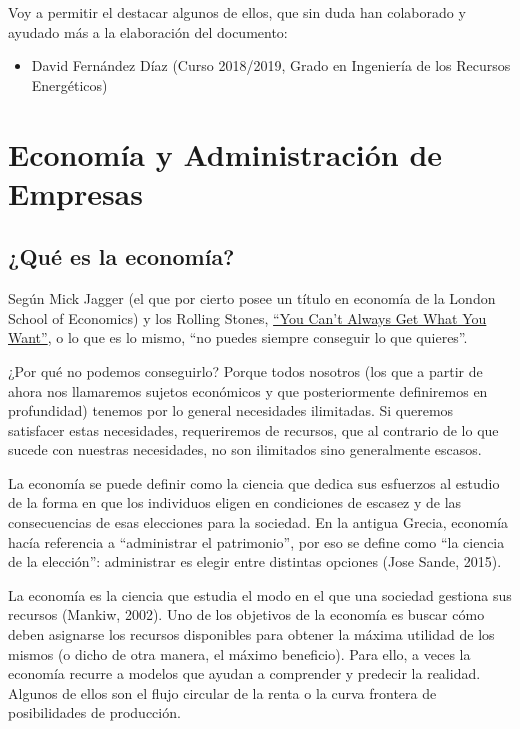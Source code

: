 \documentclass[
]{krantz}
\providecommand{\tightlist}{%
  \setlength{\itemsep}{0pt}\setlength{\parskip}{0pt}}
\begin{document}
Voy a permitir el destacar algunos de ellos, que sin duda han colaborado y ayudado más a la elaboración del documento:

\begin{itemize}
\tightlist
\item
  David Fernández Díaz (Curso 2018/2019, Grado en Ingeniería de los Recursos Energéticos)
\end{itemize}

\mainmatter

\hypertarget{part-economuxeda-y-administraciuxf3n-de-empresas}{%
\part{Economía y Administración de Empresas}\label{part-economuxeda-y-administraciuxf3n-de-empresas}}

\hypertarget{quuxe9-es-la-economuxeda}{%
\chapter{¿Qué es la economía?}\label{quuxe9-es-la-economuxeda}}

Según Mick Jagger (el que por cierto posee un título en economía de la London School of Economics) y los Rolling Stones, \href{https://www.youtube.com/watch?v=oqMl5CRoFdk}{``You Can't Always Get What You Want''}, o lo que es lo mismo, ``no puedes siempre conseguir lo que quieres''.

¿Por qué no podemos conseguirlo? Porque todos nosotros (los que a partir de ahora nos llamaremos sujetos económicos y que posteriormente definiremos en profundidad) tenemos por lo general necesidades ilimitadas. Si queremos satisfacer estas necesidades, requeriremos de recursos, que al contrario de lo que sucede con nuestras necesidades, no son ilimitados sino generalmente escasos.

La economía se puede definir como la ciencia que dedica sus esfuerzos al estudio de la forma en que los individuos eligen en condiciones de escasez y de las consecuencias de esas elecciones para la sociedad. En la antigua Grecia, economía hacía referencia a ``administrar el patrimonio'', por eso se define como ``la ciencia de la elección'': administrar es elegir entre distintas opciones (Jose Sande, 2015).

La economía es la ciencia que estudia el modo en el que una sociedad gestiona sus recursos (Mankiw, 2002). Uno de los objetivos de la economía es buscar cómo deben asignarse los recursos disponibles para obtener la máxima utilidad de los mismos (o dicho de otra manera, el máximo beneficio). Para ello, a veces la economía recurre a modelos que ayudan a comprender y predecir la realidad. Algunos de ellos son el flujo circular de la renta o la curva frontera de posibilidades de producción.
\end{document}
